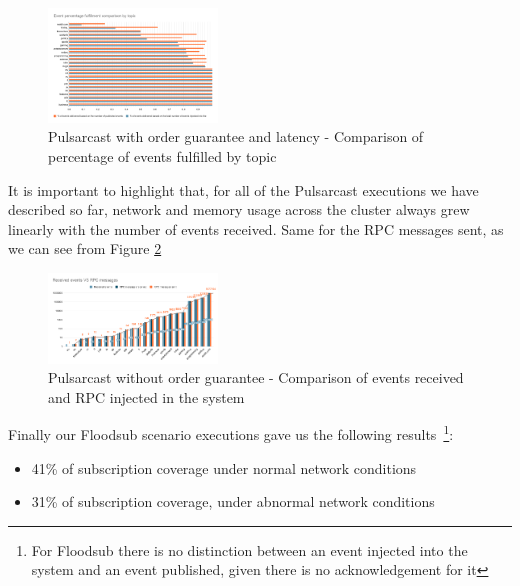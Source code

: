 \begin{figure}[!htb]
  \centering
  \includegraphics[width=0.4\textwidth]{img/graph-pulsarcast-order-latency-event-percentage-fulfillment-comparison.png}
  \caption{Pulsarcast with order guarantee and latency - Comparison of percentage of events fulfilled by topic}
  \label{fig:graph-pulsarcast-order-latency-event-percentage-fulfillment-comparison}
\end{figure}

It is important to highlight that, for all of the Pulsarcast executions we have
described so far, network and memory usage across the cluster always grew
linearly with the number of events received. Same for the RPC messages sent, as
we can see from Figure \ref{fig:graph-pulsarcast-rpc}

\begin{figure}[!htb]
  \centering
  \includegraphics[width=0.4\textwidth]{img/graph-pulsarcast-rpc.png}
  \caption{Pulsarcast without order guarantee - Comparison of events received and RPC injected in the system}
  \label{fig:graph-pulsarcast-rpc}
\end{figure}

Finally our Floodsub scenario executions gave us the following
results~\footnote{For Floodsub there is no distinction between an event
injected into the system and an event published, given there is no
acknowledgement for it}:

\begin{itemize}
  \item 41\% of subscription coverage under normal network conditions
  \item 31\% of subscription coverage, under abnormal network conditions
\end{itemize}

